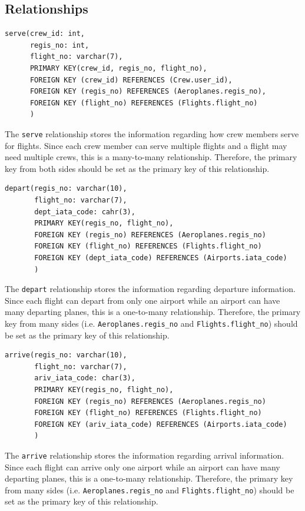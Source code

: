 \documentclass{article}
\begin{document}
	\subsection{Relationships}
	
	\begin{lstlisting}[keepspaces=true]
serve(crew_id: int, 
      regis_no: int, 
      flight_no: varchar(7),
      PRIMARY KEY(crew_id, regis_no, flight_no),
      FOREIGN KEY (crew_id) REFERENCES (Crew.user_id),
      FOREIGN KEY (regis_no) REFERENCES (Aeroplanes.regis_no),
      FOREIGN KEY (flight_no) REFERENCES (Flights.flight_no)
      )
	\end{lstlisting}    
	The \texttt{serve} relationship stores the information regarding how crew members serve for flights. Since each crew member can serve multiple flights and a flight may need multiple crews, this is a many-to-many relationship. Therefore, the primary key from both sides should be set as the primary key of this relationship.

	\begin{lstlisting}[keepspaces=true] 
depart(regis_no: varchar(10),
       flight_no: varchar(7),
       dept_iata_code: cahr(3),
       PRIMARY KEY(regis_no, flight_no),
       FOREIGN KEY (regis_no) REFERENCES (Aeroplanes.regis_no)
       FOREIGN KEY (flight_no) REFERENCES (Flights.flight_no)
       FOREIGN KEY (dept_iata_code) REFERENCES (Airports.iata_code)
       )
	\end{lstlisting}    
	The \texttt{depart} relationship stores the information regarding departure information. Since each flight can depart from only one airport while an airport can have many departing planes, this is a one-to-many relationship. Therefore, the primary key from many sides (i.e. \texttt{Aeroplanes.regis\_no} and \texttt{Flights.flight\_no}) should be set as the primary key of this relationship.

	\begin{lstlisting}[keepspaces=true]
arrive(regis_no: varchar(10),
       flight_no: varchar(7), 
       ariv_iata_code: char(3),
       PRIMARY KEY(regis_no, flight_no),
       FOREIGN KEY (regis_no) REFERENCES (Aeroplanes.regis_no)
       FOREIGN KEY (flight_no) REFERENCES (Flights.flight_no)
       FOREIGN KEY (ariv_iata_code) REFERENCES (Airports.iata_code)
       )
	\end{lstlisting}    
	The \texttt{arrive} relationship stores the information regarding arrival information. Since each flight can arrive only one airport while an airport can have many departing planes, this is a one-to-many relationship. Therefore, the primary key from many sides (i.e. \texttt{Aeroplanes.regis\_no} and \texttt{Flights.flight\_no}) should be set as the primary key of this relationship.
\end{document}
